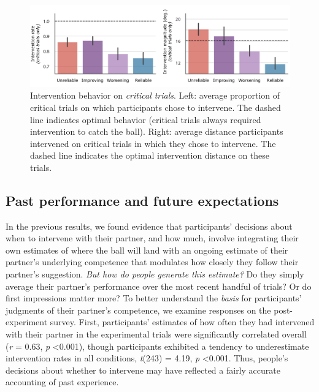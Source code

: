 \documentclass[10pt,letterpaper]{article}
\begin{document}
\begin{figure}[H]
\begin{center}
\includegraphics[width=\linewidth]{img/critical_trial_intervention_summary.pdf}
\end{center}
\caption{Intervention behavior on \textit{critical trials}. Left: average proportion of critical trials on which participants chose to intervene. The dashed line indicates optimal behavior (critical trials always required intervention to catch the ball). Right: average distance participants intervened on critical trials in which they chose to intervene. The dashed line indicates the optimal intervention distance on these trials.} 
\label{fig:critical_trials}
\end{figure}


\subsection{Past performance and future expectations}

In the previous results, we found evidence that participants' decisions about when to intervene with their partner, and how much, involve integrating their own estimates of where the ball will land with an ongoing estimate of their partner's underlying competence that modulates how closely they follow their partner's suggestion. \textit{But how do people generate this estimate?} Do they simply average their partner's performance over the most recent handful of trials? Or do first impressions matter more? To better understand the \textit{basis} for participants' judgments of their partner's competence, we examine responses on the post-experiment survey. First, participants' estimates of how often they had intervened with their partner in the experimental trials were significantly correlated overall (\textit{r} = 0.63, \textit{p} \textless{0.001}), though participants exhibited a tendency to underestimate intervention rates in all conditions, \textit{t}(243) = 4.19, \textit{p} \textless{0.001}. Thus, people's decisions about whether to intervene may have reflected a fairly accurate accounting of past experience. 
\end{document}
